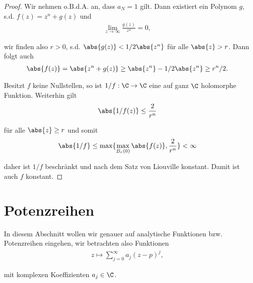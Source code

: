 \documentclass[letterpaper,10pt,german]{jupyterBook}
\begin{document}
\begin{proof}
 Wir nehmen o.B.d.A. an, dass \(a_N=1\) gilt. Dann existiert ein Polynom \(g\), s.d. \(f(z) = z^n + g(z)\) und
\begin{align*}
\lim_{z\to\infty} \frac{g(z)}{z^n} = 0,
\end{align*}
\par
wir finden also \(r>0\), s.d. \(\abs{g(z)} < 1/2 \abs{z^n}\) für alle \(\abs{z}>r\). Dann folgt auch
\begin{align*}
\abs{f(z)} = \abs{z^n + g(z)} \geq \abs{z^n} - 1/2 \abs{z^n}\geq r^n/2.
\end{align*}
\par
Besitzt \(f\) keine Nullstellen, so ist \(1/f:\C\to\C\) eine auf ganz \(\C\) holomorphe Funktion. Weiterhin gilt
\begin{align*}
\abs{1/f(z)} \leq \frac{2}{r^n}
\end{align*}
\par
für alle \(\abs{z}\geq r\) und somit
\begin{align*}
\abs{1/f} \leq \max\{\max_{B_r(0)} \abs{f(z)}, \frac{2}{r^n} \} < \infty
\end{align*}
\par
daher ist \(1/f\) beschränkt und nach dem Satz von Liouville konstant. Damit ist auch \(f\) konstant.
\end{proof}


\section{Potenzreihen}
\label{\detokenize{complexanalysis/powerseries:potenzreihen}}\label{\detokenize{complexanalysis/powerseries::doc}}
\par
In diesem Abschnitt wollen wir genauer auf analytische Funktionen bzw. Potenzreihen eingehen, wir betrachten also Funktionen
\begin{align*}
z\mapsto \sum_{j=0}^{\infty} a_j (z-p)^j,
\end{align*}
\par
mit komplexen Koeffizienten \(a_j\in\C\).
\end{document}
